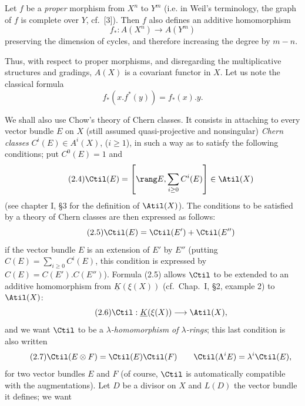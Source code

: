 Let $f$ be a \emph{proper} morphism from $X^n$ to $Y^m$ (i.e. in Weil's terminology, the graph of $f$ is complete over $Y$, cf.\ [3]). Then $f$ also defines an additive homomorphism
\begin{equation}\tag{2.2}
f_*:A(X^n)\longrightarrow A(Y^m)
\end{equation}
preserving the dimension of cycles, and therefore increasing the degree by $m-n$.

%
Thus, with respect to proper morphisms, and disregarding the multiplicative structures and gradings, $A(X)$ is a covariant functor in $X$. Let us note the classical formula
\begin{equation}\tag{2.3}
 f_*(x.f^*(y))=f_*(x).y .
\end{equation}

We shall also use Chow's theory of Chern classes. It consists in attaching to every vector bundle $E$ on $X$ (still assumed quasi-projective and nonsingular) \emph{Chern classes} $C^i(E)\in A^i(X)$, ($i\geq 1$), in such a way as to satisfy the following conditions; put $C^0(E)=1$ and
\begin{equation}\tag{2.4}
 \Ctil(E)=\left[\rang E,\sum_{i\geq 0}C^i(E)\right]\in \Atil(X)
\end{equation}
(see chapter I, \S 3 for the definition of $\Atil(X)$). The conditions to be satisfied by a theory of Chern classes are then expressed as follows:
\begin{equation}\tag{2.5}
 \Ctil(E)=\Ctil(E')+\Ctil(E'')
\end{equation}
if the vector bundle $E$ is an extension of $E'$ by $E''$ (putting $C(E)=\sum_{i\geq0}C^i(E)$, this condition is expressed by $C(E)=C(E').C(E'')$). Formula (2.5) allows $\Ctil$ to be extended to an additive homomorphism from $\underline{K}(\xi(X))$ (cf.\ Chap.\ I, \S 2, example 2) to $\Atil(X)$:
\begin{equation}\tag{2.6}
 \Ctil:\underline{K}(\xi(X))\longrightarrow \Atil(X),
\end{equation}
and we want $\Ctil$ to be a \emph{$\lambda$-homomorphism of $\lambda$-rings}; this last condition is also written
\begin{equation}\tag{2.7}
 \Ctil(E\otimes F)=\Ctil(E)\Ctil(F)\qquad
 \Ctil(\Lambda^iE)=\lambda^i\Ctil(E),
\end{equation}
for two vector bundles $E$ and $F$ (of course, $\Ctil$ is automatically compatible with the augmentations). Let $D$ be a divisor on $X$ and $L(D)$ the vector bundle it defines; we want
